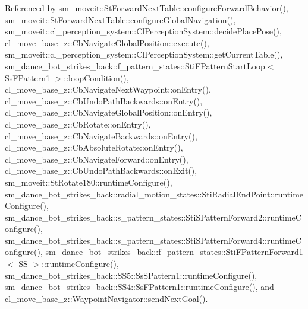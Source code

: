 Referenced by sm\+\_\+moveit\+::\+St\+Forward\+Next\+Table\+::configure\+Forward\+Behavior(), sm\+\_\+moveit\+::\+St\+Forward\+Next\+Table\+::configure\+Global\+Navigation(), sm\+\_\+moveit\+::cl\+\_\+perception\+\_\+system\+::\+Cl\+Perception\+System\+::decide\+Place\+Pose(), cl\+\_\+move\+\_\+base\+\_\+z\+::\+Cb\+Navigate\+Global\+Position\+::execute(), sm\+\_\+moveit\+::cl\+\_\+perception\+\_\+system\+::\+Cl\+Perception\+System\+::get\+Current\+Table(), sm\+\_\+dance\+\_\+bot\+\_\+strikes\+\_\+back\+::f\+\_\+pattern\+\_\+states\+::\+Sti\+F\+Pattern\+Start\+Loop$<$ Ss\+F\+Pattern1 $>$\+::loop\+Condition(), cl\+\_\+move\+\_\+base\+\_\+z\+::\+Cb\+Navigate\+Next\+Waypoint\+::on\+Entry(), cl\+\_\+move\+\_\+base\+\_\+z\+::\+Cb\+Undo\+Path\+Backwards\+::on\+Entry(), cl\+\_\+move\+\_\+base\+\_\+z\+::\+Cb\+Navigate\+Global\+Position\+::on\+Entry(), cl\+\_\+move\+\_\+base\+\_\+z\+::\+Cb\+Rotate\+::on\+Entry(), cl\+\_\+move\+\_\+base\+\_\+z\+::\+Cb\+Navigate\+Backwards\+::on\+Entry(), cl\+\_\+move\+\_\+base\+\_\+z\+::\+Cb\+Absolute\+Rotate\+::on\+Entry(), cl\+\_\+move\+\_\+base\+\_\+z\+::\+Cb\+Navigate\+Forward\+::on\+Entry(), cl\+\_\+move\+\_\+base\+\_\+z\+::\+Cb\+Undo\+Path\+Backwards\+::on\+Exit(), sm\+\_\+moveit\+::\+St\+Rotate180\+::runtime\+Configure(), sm\+\_\+dance\+\_\+bot\+\_\+strikes\+\_\+back\+::radial\+\_\+motion\+\_\+states\+::\+Sti\+Radial\+End\+Point\+::runtime\+Configure(), sm\+\_\+dance\+\_\+bot\+\_\+strikes\+\_\+back\+::s\+\_\+pattern\+\_\+states\+::\+Sti\+S\+Pattern\+Forward2\+::runtime\+Configure(), sm\+\_\+dance\+\_\+bot\+\_\+strikes\+\_\+back\+::s\+\_\+pattern\+\_\+states\+::\+Sti\+S\+Pattern\+Forward4\+::runtime\+Configure(), sm\+\_\+dance\+\_\+bot\+\_\+strikes\+\_\+back\+::f\+\_\+pattern\+\_\+states\+::\+Sti\+F\+Pattern\+Forward1$<$ S\+S $>$\+::runtime\+Configure(), sm\+\_\+dance\+\_\+bot\+\_\+strikes\+\_\+back\+::\+S\+S5\+::\+Ss\+S\+Pattern1\+::runtime\+Configure(), sm\+\_\+dance\+\_\+bot\+\_\+strikes\+\_\+back\+::\+S\+S4\+::\+Ss\+F\+Pattern1\+::runtime\+Configure(), and cl\+\_\+move\+\_\+base\+\_\+z\+::\+Waypoint\+Navigator\+::send\+Next\+Goal().


